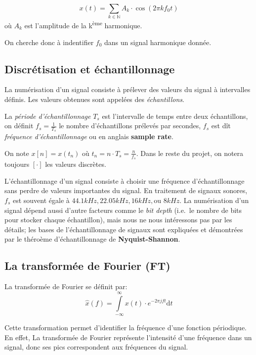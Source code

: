 \documentclass[french,]{article}
\begin{document}
\[ x(t) = \sum\limits_{k\in\mathbb{N}} A_k\cdot\cos(2\pi k f_0 t) \] où
\(A_k\) est l'amplitude de la k\textsuperscript{ème} harmonique.

On cherche donc à indentifier \(f_0\) dans un signal harmonique donnée.

\hypertarget{discretisation-et-echantillonnage}{%
\subsection{Discrétisation et
échantillonnage}\label{discretisation-et-echantillonnage}}

La numérisation d'un signal consiste à prélever des valeurs du signal à
intervalles définis. Les valeurs obtenues sont appelées des
\emph{échantillons}.

La \emph{période d'échantillonnage} \(T_s\) est l'intervalle de temps
entre deux échantillons, on définit \(f_s=\frac{1}{T_s}\) le nombre
d'échantillons prélevés par secondes, \(f_s\) est dît \emph{fréquence
d'échantillonnage} ou en anglais \textbf{sample rate}.

On note \(x[n] = x(t_n)\) où \(t_n = n\cdot T_s = \frac{n}{f_s}\). Dans
le reste du projet, on notera toujours \([\cdot]\) les valeurs
discrètes.

L'échantillonnage d'un signal consiste à choisir une fréquence
d'échantillonnage sans perdre de valeurs importantes du signal. En
traitement de signaux sonores, \(f_s\) est souvent égale à
\(44.1 kHz, 22.05 kHz, 16 kHz,\text{ou } 8kHz\). La numérisation d'un
signal dépend aussi d'autre facteurs comme le \emph{bit depth} (i.e.~le
nombre de bits pour stocker chaque échantillon), mais nous ne nous
intéressons pas par les détails; les bases de l'échantillonnage de
signaux sont expliquées et démontrées par le théroème d'échantillonnage
de \textbf{Nyquist-Shannon}.

\hypertarget{la-transformee-de-fourier-ft}{%
\subsection{La transformée de Fourier
(FT)}\label{la-transformee-de-fourier-ft}}

La transformée de Fourier se définit par:
\[\hat{x}(f) = \int\limits_{-\infty}^{\infty} x(t)\cdot e^{-2\pi j ft}\mathrm{d}t\]

Cette transformation permet d'identifier la fréquence d'une fonction
périodique. En effet, La transformée de Fourier représente l'intensité
d'une fréquence dans un signal, donc ses pics correspondent aux
fréquences du signal.
\end{document}
